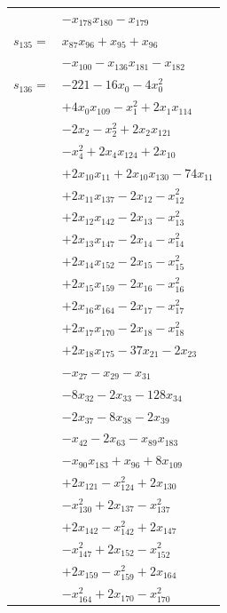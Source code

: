 \begin{longtable}{@{}r@{\;}l@{}}
 & \(\displaystyle -x_{178}x_{180} -x_{179}\) \\[3pt]
\(s_{135}=\) & \(\displaystyle x_{87}x_{96} +x_{95} +x_{96}\) \\
 & \(\displaystyle -x_{100} -x_{136}x_{181} -x_{182}\) \\[3pt]
\(s_{136}=\) & \(\displaystyle -221 -16x_{0} -4x_{0}^{2}\) \\
 & \(\displaystyle +4x_{0}x_{109} -x_{1}^{2} +2x_{1}x_{114}\) \\
 & \(\displaystyle -2x_{2} -x_{2}^{2} +2x_{2}x_{121}\) \\
 & \(\displaystyle -x_{4}^{2} +2x_{4}x_{124} +2x_{10}\) \\
 & \(\displaystyle +2x_{10}x_{11} +2x_{10}x_{130} -74x_{11}\) \\
 & \(\displaystyle +2x_{11}x_{137} -2x_{12} -x_{12}^{2}\) \\
 & \(\displaystyle +2x_{12}x_{142} -2x_{13} -x_{13}^{2}\) \\
 & \(\displaystyle +2x_{13}x_{147} -2x_{14} -x_{14}^{2}\) \\
 & \(\displaystyle +2x_{14}x_{152} -2x_{15} -x_{15}^{2}\) \\
 & \(\displaystyle +2x_{15}x_{159} -2x_{16} -x_{16}^{2}\) \\
 & \(\displaystyle +2x_{16}x_{164} -2x_{17} -x_{17}^{2}\) \\
 & \(\displaystyle +2x_{17}x_{170} -2x_{18} -x_{18}^{2}\) \\
 & \(\displaystyle +2x_{18}x_{175} -37x_{21} -2x_{23}\) \\
 & \(\displaystyle -x_{27} -x_{29} -x_{31}\) \\
 & \(\displaystyle -8x_{32} -2x_{33} -128x_{34}\) \\
 & \(\displaystyle -2x_{37} -8x_{38} -2x_{39}\) \\
 & \(\displaystyle -x_{42} -2x_{63} -x_{89}x_{183}\) \\
 & \(\displaystyle -x_{90}x_{183} +x_{96} +8x_{109}\) \\
 & \(\displaystyle +2x_{121} -x_{124}^{2} +2x_{130}\) \\
 & \(\displaystyle -x_{130}^{2} +2x_{137} -x_{137}^{2}\) \\
 & \(\displaystyle +2x_{142} -x_{142}^{2} +2x_{147}\) \\
 & \(\displaystyle -x_{147}^{2} +2x_{152} -x_{152}^{2}\) \\
 & \(\displaystyle +2x_{159} -x_{159}^{2} +2x_{164}\) \\
 & \(\displaystyle -x_{164}^{2} +2x_{170} -x_{170}^{2}\) \\

\end{longtable}
